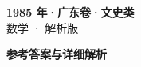 \documentclass[zihao=-4, a4paper]{ctexart}
\begin{document}
\begin{center}
  {\Large\bfseries 1985 年·广东卷·文史类}\\[4pt]
  {\large 数学 · 解析版}
\end{center}
\medskip
{}

\clearpage
{}
\begin{center}{\Large\bfseries 参考答案与详细解析}\end{center}
\medskip

\end{document}
